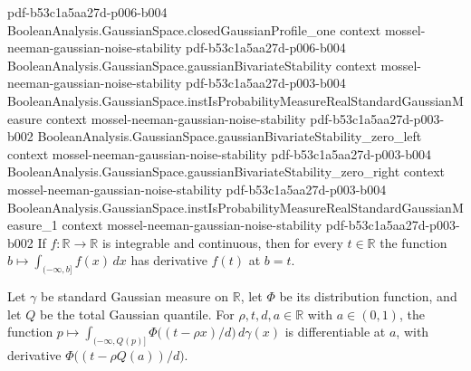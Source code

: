 \begin{lemma}
  {pdf-b53c1a5aa27d-p006-b004}
\proofstep
  {BooleanAnalysis.GaussianSpace.closedGaussianProfile_one}
  {context}
  {mossel-neeman-gaussian-noise-stability}
  {pdf-b53c1a5aa27d-p006-b004}
\proofstep
  {BooleanAnalysis.GaussianSpace.gaussianBivariateStability}
  {context}
  {mossel-neeman-gaussian-noise-stability}
  {pdf-b53c1a5aa27d-p003-b004}
\proofstep
  {BooleanAnalysis.GaussianSpace.instIsProbabilityMeasureRealStandardGaussianMeasure}
  {context}
  {mossel-neeman-gaussian-noise-stability}
  {pdf-b53c1a5aa27d-p003-b002}
\proofstep
  {BooleanAnalysis.GaussianSpace.gaussianBivariateStability_zero_left}
  {context}
  {mossel-neeman-gaussian-noise-stability}
  {pdf-b53c1a5aa27d-p003-b004}
\proofstep
  {BooleanAnalysis.GaussianSpace.gaussianBivariateStability_zero_right}
  {context}
  {mossel-neeman-gaussian-noise-stability}
  {pdf-b53c1a5aa27d-p003-b004}
\proofstep
  {BooleanAnalysis.GaussianSpace.instIsProbabilityMeasureRealStandardGaussianMeasure_1}
  {context}
  {mossel-neeman-gaussian-noise-stability}
  {pdf-b53c1a5aa27d-p003-b002}
\label{BooleanAnalysis.GaussianSpace.hasDerivAt_integral_Iic}
\leanok
{}
If $f:\mathbb R\to\mathbb R$ is integrable and continuous, then for every $t\in\mathbb
R$ the function $b\mapsto\int_{(-\infty,b]} f(x)\,dx$ has derivative $f(t)$ at $b=t$.
\end{lemma}

\begin{lemma}
\label{BooleanAnalysis.GaussianSpace.hasDerivAt_quantile_conditional_integral}
\leanok
{}
Let $\gamma$ be standard Gaussian measure on $\mathbb R$, let $\Phi$ be its distribution
function, and let $Q$ be the total Gaussian quantile. For $\rho,t,d,a\in\mathbb R$ with
$a\in(0,1)$, the function $p\mapsto\int_{(-\infty,Q(p)]}\Phi\bigl((t-\rho
x)/d\bigr)\,d\gamma(x)$ is differentiable at $a$, with derivative $\Phi\bigl((t-\rho
Q(a))/d\bigr)$.
\end{lemma}

